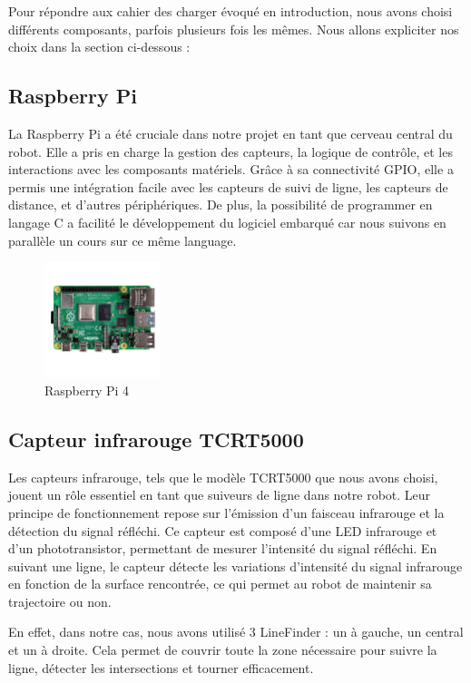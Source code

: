 Pour répondre aux cahier des charger évoqué en introduction, nous avons choisi différents composants, parfois plusieurs fois les mêmes. Nous allons expliciter nos choix dans la section ci-dessous :

\subsection{Raspberry Pi}
La Raspberry Pi a été cruciale dans notre projet en tant que cerveau central du robot. Elle a pris en charge la gestion des capteurs, la logique de contrôle, et les interactions avec les composants matériels. Grâce à sa connectivité GPIO, elle a permis une intégration facile avec les capteurs de suivi de ligne, les capteurs de distance, et d'autres périphériques. De plus, la possibilité de programmer en langage C a facilité le développement du logiciel embarqué car nous suivons en parallèle un cours sur ce même language.

\begin{figure}[h]
    \centering
    \includegraphics[width=0.3\textwidth]{images/RPi4.jpg}
    \caption{Raspberry Pi 4}
    \label{fig:Raspberry Pi 4}
\end{figure}

\subsection{Capteur infrarouge TCRT5000}
Les capteurs infrarouge, tels que le modèle TCRT5000 que nous avons choisi, jouent un rôle essentiel en tant que suiveurs de ligne dans notre robot. Leur principe de fonctionnement repose sur l'émission d'un faisceau infrarouge et la détection du signal réfléchi. Ce capteur est composé d'une LED infrarouge et d'un phototransistor, permettant de mesurer l'intensité du signal réfléchi. En suivant une ligne, le capteur détecte les variations d'intensité du signal infrarouge en fonction de la surface rencontrée, ce qui permet au robot de maintenir sa trajectoire ou non.

En effet, dans notre cas, nous avons utilisé 3 LineFinder : un à gauche, un central et un à droite. Cela permet de couvrir toute la zone nécessaire pour suivre la ligne, détecter les intersections et tourner efficacement.

